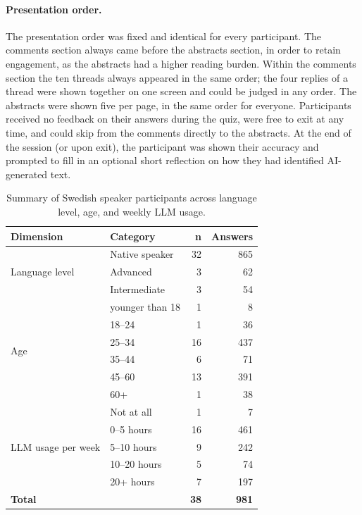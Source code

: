 \documentclass[thesis]{cluu}
\begin{document}
\paragraph{Presentation order.} The presentation order was fixed and identical for every participant. The comments section always came before the abstracts section, in order to retain engagement, as the abstracts had a higher reading burden. Within the comments section the ten threads always appeared in the same order; the four replies of a thread were shown together on one screen and could be judged in any order. The abstracts were shown five per page, in the same order for everyone. Participants received no feedback on their answers during the quiz, were free to exit at any time, and could skip from the comments directly to the abstracts. At the end of the session (or upon exit), the participant was shown their accuracy and prompted to fill in an optional short reflection on how they had identified AI-generated text.


\begin{table}[H]
\centering
\begin{tabular}{llrr}
\toprule
\textbf{Dimension} & \textbf{Category} & \textbf{n} & \textbf{Answers} \\
\midrule
\multirow{3}{*}{Language level}
  & Native speaker & 32 & 865 \\
  & Advanced       & 3  & 62  \\
  & Intermediate   & 3  & 54  \\
\midrule
\multirow{6}{*}{Age}
  & younger than 18 & 1  & 8   \\
  & 18--24          & 1  & 36  \\
  & 25--34          & 16 & 437 \\
  & 35--44          & 6  & 71  \\
  & 45--60          & 13 & 391 \\
  & 60+             & 1  & 38  \\
\midrule
\multirow{5}{*}{LLM usage per week}
  & Not at all   & 1  & 7   \\
  & 0--5 hours   & 16 & 461 \\
  & 5--10 hours  & 9  & 242 \\
  & 10--20 hours & 5  & 74  \\
  & 20+ hours    & 7  & 197 \\
\midrule
\textbf{Total} & & \textbf{38} & \textbf{981} \\
\bottomrule
\end{tabular}
\caption{Summary of Swedish speaker participants across language level, age, and
weekly LLM usage.}
\label{tab:participant-summary}
\end{table}
\end{document}
